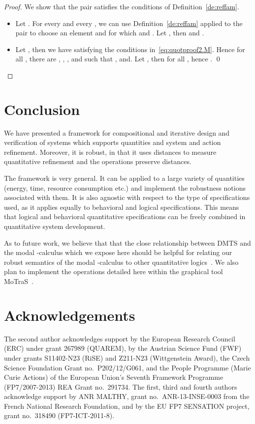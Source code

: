 \documentclass[twocolumn]{svjour3-dummy}
\begin{document}
\begin{proof}
  We show that the pair  satisfies the conditions of
  Definition~\ref{de:reffam}.
  \begin{itemize}
  \item Let .  For every  and every
    , we can use
    Definition~\ref{de:reffam} applied to the pair  to choose an
    element  and  for which
     and .  Let , then
     and .
  \item Let , then we have 
    satisfying the conditions in~\eqref{eq:quotproof2.M}.  Hence for all
    , there are , , , and  such that , 
    and\linebreak[4].  Let
    , then
     for all , hence . \qed
  \end{itemize}
\end{proof}

\section{Conclusion}

We have presented a framework for compositional and iterative design and
verification of systems which supports quantities and system and action
refinement.  Moreover, it is robust, in that it uses distances to
measure quantitative refinement and the operations preserve
distances.

The framework is very general.  It can be applied to a large variety of
quantities (energy, time, resource consumption etc.) and implement the
robustness notions associated with them.  It is also agnostic with
respect to the type of specifications used, as it applies equally to
behavioral and logical specifications.  This means that logical and
behavioral quantitative specifications can be freely combined in
quantitative system development.

As to future work, we believe that that the close relationship between
DMTS and the modal -calculus which we expose here should be helpful
for relating our robust semantics of the modal -calculus to other
quantitative logics~\cite{DBLP:conf/lics/HuthK97,
  DBLP:conf/fossacs/Mio11, DBLP:conf/concur/Alfaro03}.  We also plan to
implement the operations detailed here within the graphical tool
MoTraS~\cite{motras}.

\section*{Acknowledgements}

The second author acknowledges support by the European Research
Council (ERC) under grant 267989 (QUAREM), by the Austrian Science
Fund (FWF) under grants S11402-N23 (RiSE) and Z211-N23 (Wittgenstein
Award), the Czech Science Foundation Grant no.\ P202/12/G061, and the
People Programme (Marie Curie Actions) of the European Union's Seventh
Framework Programme (FP7/2007-2013) REA Grant no.\ 291734.  The first,
third and fourth authors acknowledge support by ANR MALTHY, grant
no.\ ANR-13-INSE-0003 from the French National Research Foundation, and
by the EU FP7 SENSATION project, grant no.\ 318490 (FP7-ICT-2011-8).
\end{document}
